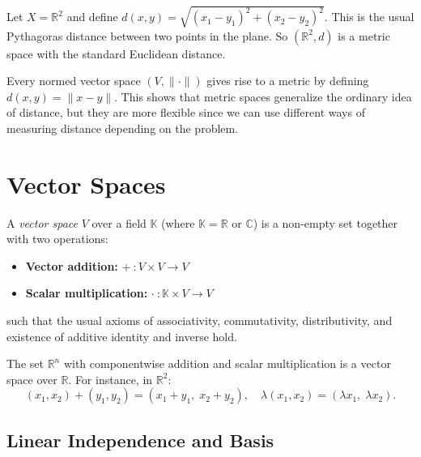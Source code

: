 \begin{example}
Let $X = \mathbb{R}^2$ and define $d(x,y) = \sqrt{(x_1-y_1)^2+(x_2-y_2)^2}$.  
This is the usual Pythagoras distance between two points in the plane.  
So $(\mathbb{R}^2,d)$ is a metric space with the standard Euclidean distance.
\end{example}

\begin{remark}
Every normed vector space $(V,\|\cdot\|)$ gives rise to a metric by defining $d(x,y) = \|x-y\|$.  
This shows that metric spaces generalize the ordinary idea of distance, but they are more flexible since we can use different ways of measuring distance depending on the problem.
\end{remark}

\section{Vector Spaces}

\begin{definition}
A \emph{vector space} $V$ over a field $\mathbb{K}$ (where $\mathbb{K} = \mathbb{R}$ or $\mathbb{C}$) is a non-empty set together with two operations:
\begin{itemize}
    \item \textbf{Vector addition:} $+\ : V \times V \to V$
    \item \textbf{Scalar multiplication:} $\cdot\ : \mathbb{K} \times V \to V$
\end{itemize}
such that the usual axioms of associativity, commutativity, distributivity, and existence of additive identity and inverse hold.
\end{definition}

\begin{example}
The set $\mathbb{R}^n$ with componentwise addition and scalar multiplication is a vector space over $\mathbb{R}$.  
For instance, in $\mathbb{R}^2$:  
\begin{equation}
(x_1,x_2) + (y_1,y_2) = (x_1+y_1,\; x_2+y_2), \quad 
\lambda(x_1,x_2) = (\lambda x_1,\; \lambda x_2).
\end{equation}
\end{example}

\subsection{Linear Independence and Basis}

